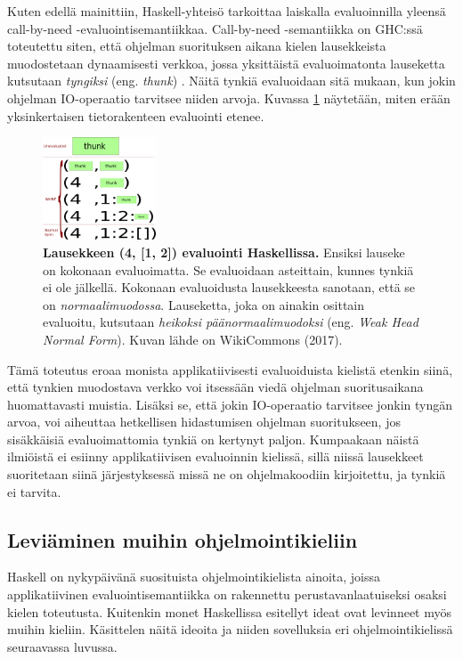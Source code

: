 Kuten edellä mainittiin, Haskell-yhteisö tarkoittaa laiskalla evaluoinnilla yleensä call-by-need -evaluointisemantiikkaa. Call-by-need -semantiikka on GHC:ssä toteutettu siten, että ohjelman suorituksen aikana kielen lausekkeista muodostetaan dynaamisesti verkkoa, jossa yksittäistä evaluoimatonta lauseketta kutsutaan \textit{tyngiksi} (eng. \textit{thunk}) \citep{hudak2007history}. Näitä tynkiä evaluoidaan sitä mukaan, kun jokin ohjelman IO-operaatio tarvitsee niiden arvoja. Kuvassa \ref{figure:thunk} näytetään, miten erään yksinkertaisen tietorakenteen evaluointi etenee.
\begin{figure}[h]
  \centering
    \includegraphics[width=0.3\textwidth]{figure-thunk-layers}
  \caption{\footnotesize\textbf{Lausekkeen (4, [1, 2]) evaluointi Haskellissa.} Ensiksi lauseke on kokonaan evaluoimatta. Se evaluoidaan asteittain, kunnes tynkiä ei ole jälkellä. Kokonaan evaluoidusta lausekkeesta sanotaan, että se on \textit{normaalimuodossa}. Lauseketta, joka on ainakin osittain evaluoitu, kutsutaan \textit{heikoksi päänormaalimuodoksi} (eng. \textit{Weak Head Normal Form}). Kuvan lähde on WikiCommons (2017).}
  \label{figure:thunk}
\end{figure}

Tämä toteutus eroaa monista applikatiivisesti evaluoiduista kielistä etenkin siinä, että tynkien muodostava verkko voi itsessään viedä ohjelman suoritusaikana huomattavasti muistia. Lisäksi se, että jokin IO-operaatio tarvitsee jonkin tyngän arvoa, voi aiheuttaa hetkellisen hidastumisen ohjelman suoritukseen, jos sisäkkäisiä evaluoimattomia tynkiä on kertynyt paljon. Kumpaakaan näistä ilmiöistä ei esiinny applikatiivisen evaluoinnin kielissä, sillä niissä lausekkeet suoritetaan siinä järjestyksessä missä ne on ohjelmakoodiin kirjoitettu, ja tynkiä ei tarvita.

\subsection{Leviäminen muihin ohjelmointikieliin}

Haskell on nykypäivänä suosituista ohjelmointikielista ainoita, joissa applikatiivinen evaluointisemantiikka on rakennettu perustavanlaatuiseksi osaksi kielen toteutusta. Kuitenkin monet Haskellissa esitellyt ideat ovat levinneet myös muihin kieliin. Käsittelen näitä ideoita ja niiden sovelluksia eri ohjelmointikielissä seuraavassa luvussa.
